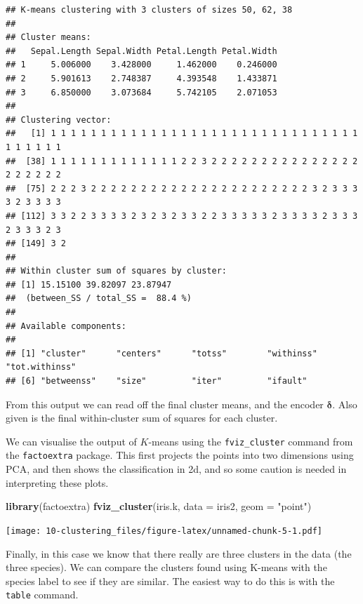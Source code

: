 \documentclass[
]{book}
\newenvironment{Shaded}{\begin{snugshade}}{\end{snugshade}}
\newcommand{\AttributeTok}[1]{\textcolor[rgb]{0.13,0.29,0.53}{#1}}
\newcommand{\FunctionTok}[1]{\textcolor[rgb]{0.13,0.29,0.53}{\textbf{#1}}}
\newcommand{\NormalTok}[1]{#1}
\newcommand{\SpecialCharTok}[1]{\textcolor[rgb]{0.81,0.36,0.00}{\textbf{#1}}}
\newcommand{\StringTok}[1]{\textcolor[rgb]{0.31,0.60,0.02}{#1}}
\theoremstyle{definition}
\theoremstyle{definition}
\theoremstyle{definition}
\theoremstyle{definition}
\theoremstyle{remark}
\begin{document}
\begin{verbatim}
## K-means clustering with 3 clusters of sizes 50, 62, 38
## 
## Cluster means:
##   Sepal.Length Sepal.Width Petal.Length Petal.Width
## 1     5.006000    3.428000     1.462000    0.246000
## 2     5.901613    2.748387     4.393548    1.433871
## 3     6.850000    3.073684     5.742105    2.071053
## 
## Clustering vector:
##   [1] 1 1 1 1 1 1 1 1 1 1 1 1 1 1 1 1 1 1 1 1 1 1 1 1 1 1 1 1 1 1 1 1 1 1 1 1 1
##  [38] 1 1 1 1 1 1 1 1 1 1 1 1 1 2 2 3 2 2 2 2 2 2 2 2 2 2 2 2 2 2 2 2 2 2 2 2 2
##  [75] 2 2 2 3 2 2 2 2 2 2 2 2 2 2 2 2 2 2 2 2 2 2 2 2 2 2 3 2 3 3 3 3 2 3 3 3 3
## [112] 3 3 2 2 3 3 3 3 2 3 2 3 2 3 3 2 2 3 3 3 3 3 2 3 3 3 3 2 3 3 3 2 3 3 3 2 3
## [149] 3 2
## 
## Within cluster sum of squares by cluster:
## [1] 15.15100 39.82097 23.87947
##  (between_SS / total_SS =  88.4 %)
## 
## Available components:
## 
## [1] "cluster"      "centers"      "totss"        "withinss"     "tot.withinss"
## [6] "betweenss"    "size"         "iter"         "ifault"
\end{verbatim}

From this output we can read off the final cluster means, and the encoder \(\boldsymbol \delta\). Also given is the final within-cluster sum of squares for each cluster.

We can visualise the output of \(K\)-means using the \texttt{fviz\_cluster} command from the \texttt{factoextra} package. This first projects the points into two dimensions using PCA, and then shows the classification in 2d, and so some caution is needed in interpreting these plots.

\begin{Shaded}
\begin{Highlighting}[]
\FunctionTok{library}\NormalTok{(factoextra)}
\FunctionTok{fviz\_cluster}\NormalTok{(iris.k, }\AttributeTok{data =}\NormalTok{ iris2,}
             \AttributeTok{geom =} \StringTok{"point"}\NormalTok{)}
\end{Highlighting}
\end{Shaded}

\texttt{[image: 10-clustering\_files/figure-latex/unnamed-chunk-5-1.pdf]}

Finally, in this case we know that there really are three clusters in the data (the three species). We can compare the clusters found using K-means with the species label to see if they are similar. The easiest way to do this is with the \texttt{table} command.

\begin{Shaded}
\end{Shaded}
\end{document}
